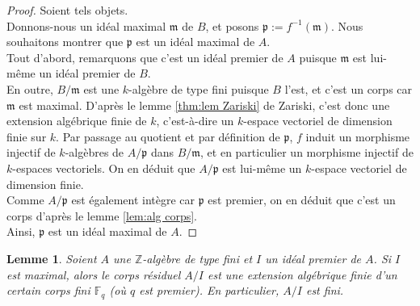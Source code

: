 \documentclass[10pt, twoside]{article}
\theoremstyle{plain}
\theoremstyle{definition}
\theoremstyle{plain}
\theoremstyle{plain}
\newtheorem{lemma}[theorem]{Lemme}
\theoremstyle{definition}
\theoremstyle{remark}
\begin{document}
\begin{proof}
    Soient tels objets. \\
    Donnons-nous un idéal maximal $\mathfrak{m}$ de $B$, et posons $\mathfrak{p} := f^{-1}(\mathfrak{m})$. Nous souhaitons montrer que $\mathfrak{p}$ est un idéal maximal de $A$.\\
    Tout d'abord, remarquons que c'est un idéal premier de $A$ puisque $\mathfrak{m}$ est lui-même un idéal premier de $B$.\\
    En outre, $B/\mathfrak{m}$ est une $k$-algèbre de type fini puisque $B$ l'est, et c'est un corps car $\mathfrak{m}$ est maximal. D'après le lemme \ref{thm:lem Zariski} de Zariski, c'est donc une extension algébrique finie de $k$, c'est-à-dire un $k$-espace vectoriel de dimension finie sur $k$. 
    Par passage au quotient et par définition de $\mathfrak{p}$, $f$ induit un morphisme injectif de $k$-algèbres de $A/\mathfrak{p}$ dans $B/\mathfrak{m}$, et en particulier un morphisme injectif de $k$-espaces vectoriels. On en déduit que $A/\mathfrak{p}$ est lui-même un $k$-espace vectoriel de dimension finie.\\
    Comme $A/\mathfrak{p}$ est également intègre car $\mathfrak{p}$ est premier, on en déduit que c'est un corps d'après le lemme \ref{lem:alg corps}.\\
    Ainsi, $\mathfrak{p}$ est un idéal maximal de $A$.  
\end{proof}

\begin{lemma}\label{lem:corps Z-alg tf fini}
    Soient $A$ une $\mathbb{Z}$-algèbre de type fini et $I$ un idéal premier de $A$. Si $I$ est maximal, alors le corps résiduel $A/I$ est une extension algébrique finie d'un certain corps fini $\mathbb{F}_q$ (où $q$ est premier). En particulier, $A/I$ est fini.
\end{lemma}
\end{document}
